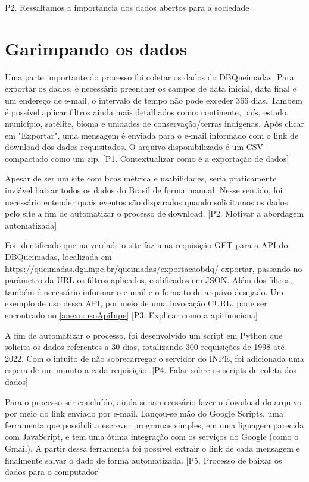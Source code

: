 \documentclass[cic,tc]{iiufrgs}
\begin{document}
P2. Ressaltamos a importancia dos dados abertos para a sociedade \par


\section{Garimpando os dados}

Uma parte importante do processo foi coletar os dados do DBQueimadas. 
Para exportar os dados, é necessário preencher os campos de data inicial,
data final e um endereço de e-mail, o intervalo de tempo não 
pode exceder 366 dias. Também é possível aplicar filtros ainda mais 
detalhados como: continente, país, estado, município, satélite, bioma e 
unidades de conservação/terras indígenas. Após clicar em "Exportar", 
uma mensagem é enviada para o e-mail informado com o link de download 
dos dados requisitados. O arquivo disponibilizado é um CSV compactado 
como um zip. [P1. Contextualizar como é a exportação de dados]\par

Apesar de ser um site com boas métrica e usabilidades, seria praticamente 
inviável baixar todos os dados do Brasil de forma manual. Nesse sentido, 
foi necessário entender quais eventos são disparados quando solicitamos 
os dados pelo site a fim de automatizar o processo de download. 
[P2. Motivar a abordagem automatizada] \par

Foi identificado que na verdade o site faz uma requisição GET para a API do 
DBQueimadas, localizada em https://queimadas.dgi.inpe.br/queimadas/exportacaobdq/
exportar, passando no parâmetro da URL os filtros aplicados, codificados em JSON.
Além dos filtros, também é necessário informar o e-mail e o formato de arquivo
desejado. Um exemplo de uso dessa API, por meio de uma invocação CURL, pode 
ser encontrado no \ref{anexo:usoApiInpe} [P3. Explicar como a api funciona]

A fim de automatizar o processo, foi desenvolvido um script em Python que 
solicita os dados referentes a 30 dias, totalizando 300 requisições de 1998 
até 2022. Com 
o intuito de não sobrecarregar o servidor do INPE, foi adicionada uma espera de 
um minuto a cada requisição. [P4. Falar sobre os scripts de coleta dos dados] \par

Para o processo ser concluído, ainda seria 
necessário fazer o download do arquivo por meio do link enviado por e-mail.
Lançou-se mão do Google Scripts, uma ferramenta que possibilita escrever 
programas simples, em uma liguagem parecida com JavaScript, e tem uma ótima
integração com os serviços do Google (como o Gmail). A partir dessa ferramenta
foi possível extrair o link de cada mensagem e finalmente salvar o dado
de forma automatizada. [P5. Processo de baixar os dados para o computador] \par
\end{document}
